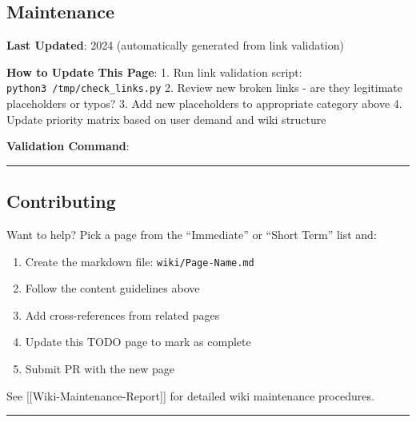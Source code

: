 \subsection{\texorpdfstring{
Maintenance}{ Maintenance}}\label{maintenance}

\textbf{Last Updated}: 2024 (automatically generated from link
validation)

\textbf{How to Update This Page}: 1. Run link validation script:
\texttt{python3\ /tmp/check\_links.py} 2. Review new broken links - are
they legitimate placeholders or typos? 3. Add new placeholders to
appropriate category above 4. Update priority matrix based on user
demand and wiki structure

\textbf{Validation Command}:

\begin{Shaded}
\begin{Highlighting}[]
\end{Highlighting}
\end{Shaded}

\begin{center}\rule{0.5\linewidth}{0.5pt}\end{center}

\subsection{\texorpdfstring{
Contributing}{ Contributing}}\label{contributing}

Want to help? Pick a page from the ``Immediate'' or ``Short Term'' list
and:

\begin{enumerate}
\def\labelenumi{\arabic{enumi}.}
\tightlist
\item
  Create the markdown file: \texttt{wiki/Page-Name.md}
\item
  Follow the content guidelines above
\item
  Add cross-references from related pages
\item
  Update this TODO page to mark as complete
\item
  Submit PR with the new page
\end{enumerate}

See {[}{[}Wiki-Maintenance-Report{]}{]} for detailed wiki maintenance
procedures.

\begin{center}\rule{0.5\linewidth}{0.5pt}\end{center}

